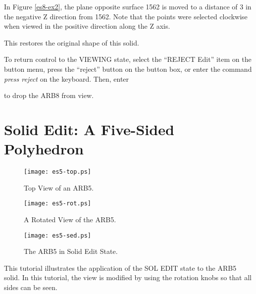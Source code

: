 
In Figure \ref{es8-ex2},
the plane opposite surface 1562 is moved to a distance of 3
in the negative Z direction from 1562.  Note that the points were selected
clockwise when viewed in the positive direction along the Z axis.


This restores the original shape of this solid.

To return control to the VIEWING state, select the ``REJECT Edit''
item on the button menu, press the ``reject'' button on the button box,
or enter the command {\em press reject} on the keyboard.
Then, enter


to drop the ARB8 from view.

\section{Solid Edit:  A Five-Sided Polyhedron}

\begin{figure}
\centering \texttt{[image: es5-top.ps]}
\caption{Top View of an ARB5.}
\label{es5-top}
\end{figure}

\begin{figure}
\centering \texttt{[image: es5-rot.ps]}
\caption{A Rotated View of the ARB5.}
\label{es5-rot}
\end{figure}

\begin{figure}
\centering \texttt{[image: es5-sed.ps]}
\caption{The ARB5 in Solid Edit State.}
\label{es5-sed}
\end{figure}

This tutorial illustrates the application of the SOL EDIT state to the ARB5
solid.
In this tutorial, the view is modified by using the rotation
knobs so that all sides can be seen.


